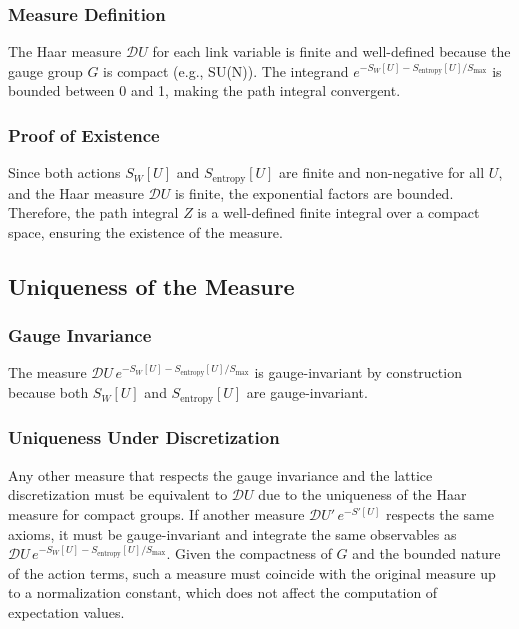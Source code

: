 \subsubsection{Measure Definition}
The Haar measure \(\mathcal{D}U\) for each link variable is finite and well-defined because the gauge group \(G\) is compact (e.g., SU(N)). The integrand \(e^{-S_W[U] - S_{\text{entropy}}[U]/S_{\text{max}}}\) is bounded between 0 and 1, making the path integral convergent.

\subsubsection{Proof of Existence}
Since both actions \(S_W[U]\) and \(S_{\text{entropy}}[U]\) are finite and non-negative for all \(U\), and the Haar measure \(\mathcal{D}U\) is finite, the exponential factors are bounded. Therefore, the path integral \(Z\) is a well-defined finite integral over a compact space, ensuring the existence of the measure.

\subsection{Uniqueness of the Measure}

\subsubsection{Gauge Invariance}
The measure \(\mathcal{D}U \, e^{-S_W[U] - S_{\text{entropy}}[U]/S_{\text{max}}}\) is gauge-invariant by construction because both \(S_W[U]\) and \(S_{\text{entropy}}[U]\) are gauge-invariant.

\subsubsection{Uniqueness Under Discretization}
Any other measure that respects the gauge invariance and the lattice discretization must be equivalent to \(\mathcal{D}U\) due to the uniqueness of the Haar measure for compact groups. If another measure \(\mathcal{D}U' \, e^{-S'[U]}\) respects the same axioms, it must be gauge-invariant and integrate the same observables as \(\mathcal{D}U \, e^{-S_W[U] - S_{\text{entropy}}[U]/S_{\text{max}}}\). Given the compactness of \(G\) and the bounded nature of the action terms, such a measure must coincide with the original measure up to a normalization constant, which does not affect the computation of expectation values.


